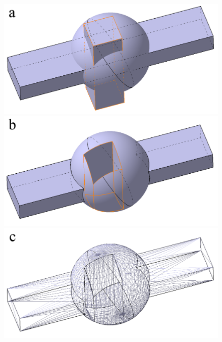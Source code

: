 \begin{figure}[H]
\begin{minipage}[b]{0.495\textwidth}
\includegraphics[width=1.0\textwidth]{pictures/DiffGeoRepr_a.png}
\end{minipage}
\hspace{0.01\textwidth}
\begin{minipage}[b]{0.495\textwidth}
\includegraphics[width=1.0\textwidth]{pictures/DiffGeoRepr_b.png}
\end{minipage}
\begin{minipage}[b]{0.495\textwidth}
\includegraphics[width=1.0\textwidth]{pictures/DiffGeoRepr_c.png}

\end{minipage}
\end{figure}
